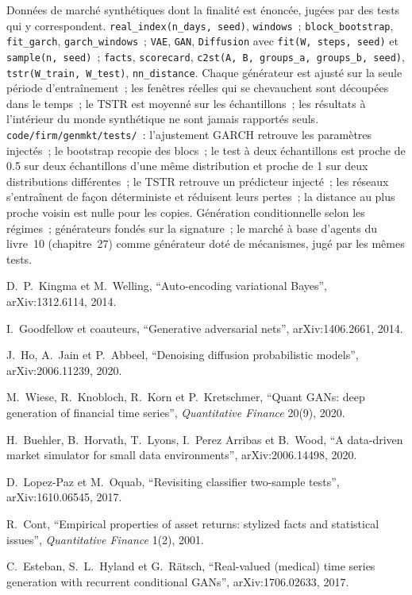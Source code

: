 \begin{build}
 Données de marché synthétiques dont la finalité est énoncée, jugées par des tests qui y correspondent.
 \texttt{real\_index(n\_days, seed)}, \texttt{windows}~; \texttt{block\_bootstrap}, \texttt{fit\_garch},
\texttt{garch\_windows}~; \texttt{VAE}, \texttt{GAN}, \texttt{Diffusion} avec \texttt{fit(W, steps, seed)} et
\texttt{sample(n, seed)}~; \texttt{facts}, \texttt{scorecard}, \texttt{c2st(A, B, groups\_a, groups\_b, seed)},
\texttt{tstr(W\_train, W\_test)}, \texttt{nn\_distance}.
 Chaque générateur est ajusté sur la seule période d'entraînement~; les fenêtres réelles qui se chevauchent sont découpées dans le temps~; le TSTR est
moyenné sur les échantillons~; les résultats à l'intérieur du monde synthétique ne sont jamais rapportés seuls.
 \texttt{code/firm/genmkt/tests/}~: l'ajustement GARCH retrouve les paramètres injectés~; le bootstrap recopie
des blocs~; le test à deux échantillons est proche de 0.5 sur deux échantillons d'une même distribution et proche de 1 sur deux distributions différentes~; le TSTR retrouve un
prédicteur injecté~; les réseaux s'entraînent de façon déterministe et réduisent leurs pertes~; la distance au plus proche voisin est nulle pour
les copies.
 Génération conditionnelle selon les régimes~; générateurs fondés sur la signature~; le marché à base d'agents du livre~10 (chapitre~27)
comme générateur doté de mécanismes, jugé par les mêmes tests.
\end{build}

\begin{omsources}
\item D.~P.~Kingma et M.~Welling, ``Auto-encoding variational Bayes'', arXiv:1312.6114, 2014.
\item I.~Goodfellow et coauteurs, ``Generative adversarial nets'', arXiv:1406.2661, 2014.
\item J.~Ho, A.~Jain et P.~Abbeel, ``Denoising diffusion probabilistic models'', arXiv:2006.11239, 2020.
\item M.~Wiese, R.~Knobloch, R.~Korn et P.~Kretschmer, ``Quant GANs: deep generation of financial time series'',
\emph{Quantitative Finance} 20(9), 2020.
\item H.~Buehler, B.~Horvath, T.~Lyons, I.~Perez Arribas et B.~Wood, ``A data-driven market simulator for small data
environments'', arXiv:2006.14498, 2020.
\item D.~Lopez-Paz et M.~Oquab, ``Revisiting classifier two-sample tests'', arXiv:1610.06545, 2017.
\item R.~Cont, ``Empirical properties of asset returns: stylized facts and statistical issues'', \emph{Quantitative Finance}
1(2), 2001.
\item C.~Esteban, S.~L.~Hyland et G.~Rätsch, ``Real-valued (medical) time series generation with recurrent conditional
GANs'', arXiv:1706.02633, 2017.
\end{omsources}

